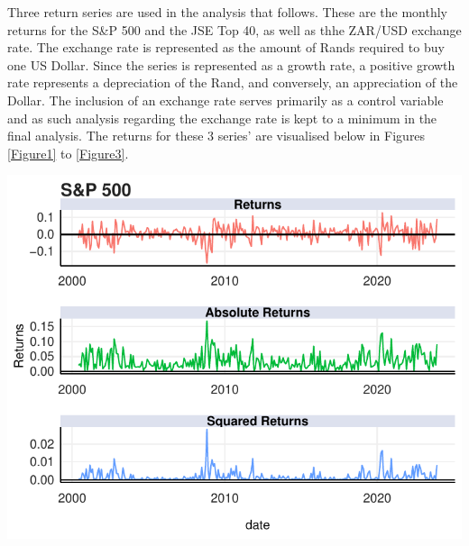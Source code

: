 \documentclass[11pt,preprint, authoryear]{elsarticle}
\let\origfigure\figure
\let\endorigfigure\endfigure
\renewenvironment{figure}[1][2] {
    \expandafter\origfigure\expandafter[H]
} {
    \endorigfigure
}
\numberwithin{equation}{section}
\numberwithin{figure}{section}
\numberwithin{table}{section}
\begin{document}
Three return series are used in the analysis that follows. These are the
monthly returns for the S\&P 500 and the JSE Top 40, as well as thhe
ZAR/USD exchange rate. The exchange rate is represented as the amount of
Rands required to buy one US Dollar. Since the series is represented as
a growth rate, a positive growth rate represents a depreciation of the
Rand, and conversely, an appreciation of the Dollar. The inclusion of an
exchange rate serves primarily as a control variable and as such
analysis regarding the exchange rate is kept to a minimum in the final
analysis. The returns for these 3 series' are visualised below in
Figures \ref{Figure1} to \ref{Figure3}.

\begin{figure}[H]

{\centering \includegraphics{FormalWriteUp_files/figure-latex/Figure1-1} 

}

\caption{S\&P 500 Returns \label{Figure1}}\label{fig:Figure1}
\end{figure}
\end{document}
